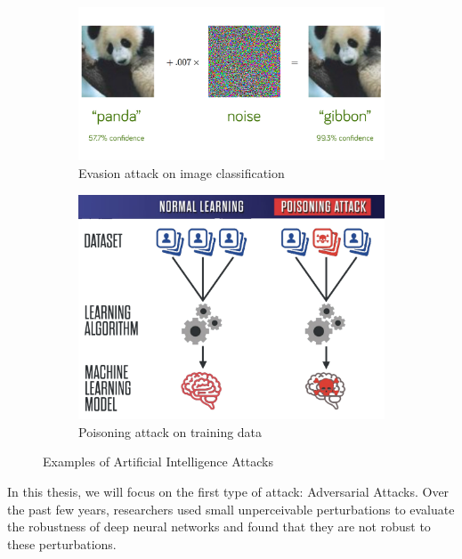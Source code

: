 \begin{figure}[H]
    \begin{subfigure}{0.45\textwidth}
      \includegraphics[width=\linewidth]{images/2_2_evasion.png}
      \caption{Evasion attack on image classification \cite{szegedy2013intriguing}} \label{fig:2_2_evasion}
    \end{subfigure}%
    \hspace*{\fill}   %
    \begin{subfigure}{0.45\textwidth}
      \includegraphics[width=\linewidth]{images/2_2_data_poisoning.png}
      \caption{Poisoning attack on training data \cite{Comiter2019AttackingAI}} \label{fig:2_2_data_poisoning}
    \end{subfigure}
  \caption{Examples of Artificial Intelligence Attacks} \label{fig:2_2_adversarial_attacks}
  \end{figure}

In this thesis, we will focus on the first type of attack: Adversarial Attacks.
Over the past few years, researchers \cite{goodfellow2014explaining, szegedy2013intriguing} used small unperceivable perturbations to evaluate the robustness of deep neural networks and found that they are not robust to these perturbations. 

